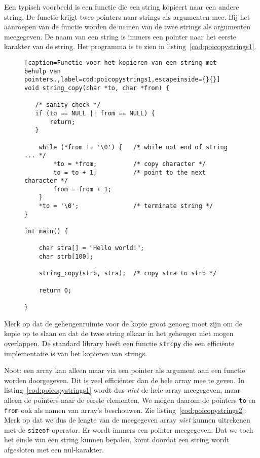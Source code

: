 Een typisch voorbeeld is een functie die een string kopieert naar een andere string. De functie krijgt twee pointers naar strings als argumenten mee. Bij het aanroepen van de functie worden de namen van de twee strings als argumenten meegegeven. De naam van een string is immers een pointer naar het eerste karakter van de string. Het programma is te zien in listing~\ref{cod:poicopystrings1}.

\begin{figure}[!ht]
\begin{lstlisting}[caption=Functie voor het kopieren van een string met behulp van pointers.,label=cod:poicopystrings1,escapeinside={}{}]
void string_copy(char *to, char *from) {

   /* sanity check */
   if (to == NULL || from == NULL) {
       return;
   }

    while (*from != '\0') {   /* while not end of string ... */
        *to = *from;          /* copy character */
        to = to + 1;          /* point to the next character */
        from = from + 1;
    }
    *to = '\0';               /* terminate string */
}

int main() {

    char stra[] = "Hello world!";
    char strb[100];

    string_copy(strb, stra);  /* copy stra to strb */

	return 0;

}
\end{lstlisting}
\end{figure}

Merk op dat de geheugenruimte voor de kopie groot genoeg moet zijn om de kopie op te slaan en dat de twee string elkaar in het geheugen niet mogen overlappen. De standard library heeft een functie \texttt{strcpy} die een efficiënte implementatie is van het kopiëren van strings.

Noot: een array kan alleen maar via een pointer als argument aan een functie worden doorgegeven. Dit is veel efficiënter dan de hele array mee te geven. In listing~\ref{cod:poicopystrings1} wordt dus \textsl{niet} de hele array meegegeven, maar alleen de pointers naar de eerste elementen. We mogen daarom de pointers \texttt{to} en \texttt{from} ook als namen van array's beschouwen.  Zie listing~\ref{cod:poicopystrings2}. Merk op dat we dus de lengte van de meegegeven array \textsl{niet} kunnen uitrekenen met de \texttt{sizeof}-operator. Er wordt immers een pointer meegegeven. Dat we toch het einde van een string kunnen bepalen, komt doordat een string wordt afgesloten met een nul-karakter. %

